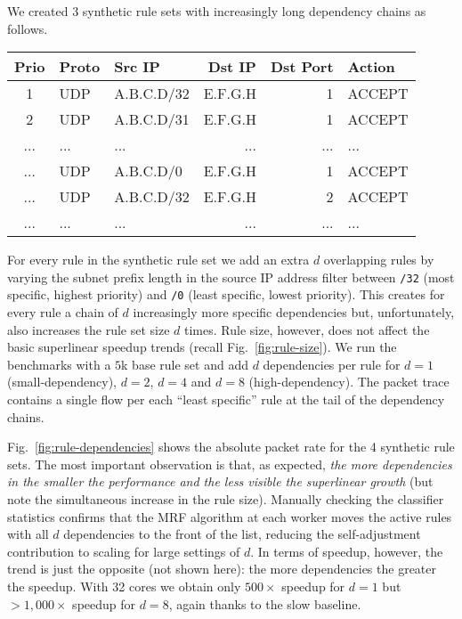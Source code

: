 We created 3 synthetic rule sets with increasingly long dependency chains as follows.

\noindent %
\begin{small}
  \addtolength{\tabcolsep}{-1pt}    
  \begin{tabular}{c|l|l|r|r|l}
    \textbf{Prio} & \textbf{Proto} & \textbf{Src IP} & \textbf{Dst IP} & \textbf{Dst Port} & \textbf{Action}\\
    \hline
    1 & UDP & A.B.C.D/32   & E.F.G.H  & 1  & ACCEPT\\
    2 & UDP & A.B.C.D/31   & E.F.G.H  & 1  & ACCEPT\\
    ... & ... & ...   & ...  & ...  & ...\\
    ... & UDP & A.B.C.D/0   & E.F.G.H  & 1  & ACCEPT\\
    ... & UDP & A.B.C.D/32  & E.F.G.H  & 2  & ACCEPT\\
    ... & ... & ...   & ...  & ...  & ...\\
  \end{tabular}
  \addtolength{\tabcolsep}{1pt}    
\end{small}

\noindent %
For every rule in the synthetic rule set we add an extra $d$ overlapping rules by varying the subnet prefix length in the source IP address filter between \texttt{/32} (most specific, highest priority) and \texttt{/0} (least specific, lowest priority). This creates for every rule a chain of $d$ increasingly more specific dependencies but, unfortunately, also increases the rule set size $d$ times. Rule size, however, does not affect the basic superlinear speedup trends (recall Fig.~\ref{fig:rule-size}). We run the benchmarks with a $5$k base rule set and add $d$ dependencies per rule for $d=1$ (small-dependency), $d=2$, $d=4$ and $d=8$ (high-dependency). The packet trace contains a single flow per each ``least specific'' rule at the tail of the dependency chains.

Fig.~\ref{fig:rule-dependencies} shows the absolute packet rate for the 4 synthetic rule sets. The most important observation is that, as expected, \emph{the more dependencies in the smaller the performance and the less visible the superlinear growth} (but note the simultaneous increase in the rule size). Manually checking the classifier statistics confirms that the MRF algorithm at each worker moves the active rules with all $d$ dependencies to the front of the list, reducing the self-adjustment contribution to scaling for large settings of $d$. In terms of speedup, however, the trend is just the opposite (not shown here): the more dependencies the greater the speedup. With 32 cores we obtain only $500\times$ speedup for $d=1$ but $>1,000\times$ speedup for $d=8$, again thanks to the slow baseline.

